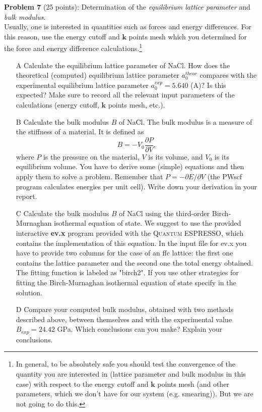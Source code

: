 \documentclass[12pt]{article}
\def\QE{\textsc{Quantum ESPRESSO}}
\begin{document}

  \newpage

  \noindent
  {\bf Problem 7} (25 points): Determination of the {\it equilibrium lattice parameter} and {\it bulk modulus}. \\

  \noindent
  Usually, one is interested in quantities such as forces and energy differences.
  For this reason, use the energy cutoff and $\mathbf{k}$ points mesh which you determined for
  the force and energy difference calculations.\footnote{In general, to be absolutely safe you should test the convergence of the quantity you are interested in (lattice parameter and bulk modulus in this case) with respect to the energy cutoff and $\mathbf{k}$ points mesh (and other parameters, which we don't have for our system (e.g. smearing)). But we are not going to do this.}

  \begin{itemize}

    \item[A]
    Calculate the equilibrium lattice parameter of NaCl. How does the theoretical (computed) equilibrium lattice parameter $a_0^{theor}$ compares with the experimental equilibrium lattice parameter $a_0^{exp} = 5.640$ (A)? Is this expected? Make sure to record all the relevant input parameters of the calculations (energy cutoff, $\mathbf{k}$ points mesh, etc.).

    \item[B]
    Calculate the bulk modulus $B$ of NaCl. The bulk modulus is a measure of the stiffness of a material. It is defined as
    $$ B = - V_0 \frac{\partial P}{\partial V}, $$
    where $P$ is the pressure on the material, $V$ is its volume, and $V_0$ is its
    equilibrium volume. You have to derive some (simple) equations and then apply them to solve a problem. Remember that $P=-\partial{E}/\partial{V}$ (the PWscf program calculates energies per unit cell). 
    Write down your derivation in your report.

    \item[C]
    Calculate the bulk modulus $B$ of NaCl using the third-order Birch-Murnaghan isothermal equation of state. We suggest to use the provided interactive {\bf ev.x} program provided with the \QE, 
    which contains the implementation of this equation. In the input file for ev.x you have to provide two columns for the case of an ffc lattice: 
    the first one contains the lattice parameter and the second one the total energy obtained. The 
    fitting function is labeled as "birch2". If you use
    other strategies for fitting the Birch-Murnaghan isothermal equation of state specify in the solution.

    \item[D]
    Compare your computed bulk modulus, obtained with two methods described above, between themselves and with the experimental value $B_{exp}=24.42$ GPa. Which conclusions can you make? Explain your conclusions.

  \end{itemize}
\end{document}
